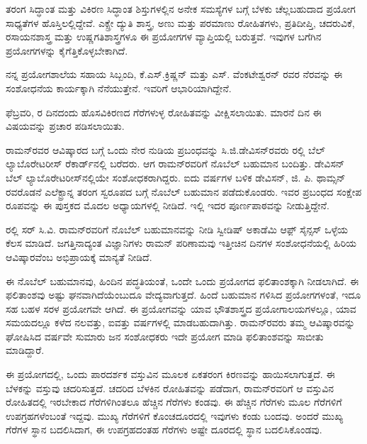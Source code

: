 
ತರಂಗ ಸಿದ್ಧಾಂತ ಮತ್ತು ವಿಕಿರಣ ಸಿದ್ಧಾಂತ ಶಿಸ್ತುಗಳಲ್ಲಿನ ಅನೇಕ ಸಮಸ್ಯೆಗಳ ಬಗ್ಗೆ ಬೆಳಕು ಚೆಲ್ಲಬಹುದಾದ ಪ್ರಯೋಗ ಸಾಧ್ಯತೆಗಳ ಹೊಸ್ತಿಲಲ್ಲಿದ್ದೇವೆ. ಎಕ್ಸ್\enginline{-}ರೇ ದ್ಯುತಿ ಶಾಸ್ತ್ರ, ಅಣು ಮತ್ತು ಪರಮಾಣು ರೋಹಿತಗಳು, ಪ್ರತಿದೀಪ್ತಿ, ಚದರುವಿಕೆ, ರಸಾಯನಶಾಸ್ತ್ರ ಮತ್ತು ಉಷ್ಣಗತಿಶಾಸ್ತ್ರಗಳೂ ಈ ಪ್ರಯೋಗಗಳ ವ್ಯಾಪ್ತಿಯಲ್ಲಿ ಬರುತ್ತವೆ. ಇವುಗಳ ಬಗೆಗಿನ ಪ್ರಯೋಗಗಳನ್ನು ಕೈಗೆತ್ತಿಕೊಳ್ಳಬೇಕಾಗಿದೆ.

ನನ್ನ ಪ್ರಯೋಗಶಾಲೆಯ ಸಹಾಯ ಸಿಬ್ಬಂದಿ, ಕೆ.ಎಸ್.ಕ್ರಿಷ್ಣನ್ ಮತ್ತು ಎಸ್. ವೆಂಕಟೇಶ್ವರನ್ ರವರ ನೆರವನ್ನು ಈ ಸಂಶೋಧನೆಯ ಕಾರ್ಯಕ್ಕಾಗಿ ನೆನೆಯುತ್ತೇನೆ. ಇವರಿಗೆ ಆಭಾರಿಯಾಗಿದ್ದೇನೆ.

 ಫೆಬ್ರವರಿ,  ರ ದಿನದಂದು ಹೊಸವಿಕಿರಣದ ಗೆರೆಗಳುಳ್ಳ ರೋಹಿತವನ್ನು ವೀಕ್ಷಿಸ\-ಲಾಯಿತು. ಮಾರನೆ ದಿನ ಈ ವಿಷಯವನ್ನು ಪ್ರಚಾರ ಪಡಿಸಲಾಯಿತು.



ರಾಮನ್‍ರವರ ಆವಿಷ್ಕಾರದ ಬಗ್ಗೆ ಒಂದು ನೇರ ನುಡಿಯ ಪ್ರಬಂಧವನ್ನು ಸಿ.ಜಿ.ಡೇವಿಸನ್‌ರವರು ರಲ್ಲಿ ಬೆಲ್ ಲ್ಯಾಬೊರೇಟರೀಸ್ ರೆಕಾರ್ಡ್‌ನಲ್ಲಿ ಬರೆದರು. ಆಗ ರಾಮನ್‍ರವರಿಗೆ ನೊಬೆಲ್ ಬಹುಮಾನ ಬಂದಿತ್ತು. ಡೇವಿಸನ್ ಬೆಲ್ ಲ್ಯಾಬೊರೇಟರೀಸ್‌ನಲ್ಲಿಯೇ ಸಂಶೋಧಕರಾಗಿ\break ದ್ದರು. ಐದು ವರ್ಷಗಳ ಬಳಿಕ ಡೇವಿಸನ್, ಜಿ. ಪಿ. ಥಾಮ್ಸನ್ ರವರೊಡನೆ ಎಲೆಕ್ಟ್ರಾನ್ನ ತರಂಗ ಸ್ವರೂಪದ ಬಗ್ಗೆ ನೊಬೆಲ್ ಬಹುಮಾನ ಪಡೆದುಕೊಂಡರು. ಇವರ ಪ್ರಬಂಧದ ಸಂಕ್ಷೇಪ ರೂಪವನ್ನು ಈ ಪುಸ್ತಕದ ಮೊದಲ ಅಧ್ಯಾಯಗಳಲ್ಲಿ ನೀಡಿದೆ. ಇಲ್ಲಿ ಇದರ ಪೂರ್ಣಪಾಠವನ್ನು ನೀಡುತ್ತಿದ್ದೇನೆ.

ರಲ್ಲಿ  ಸರ್ ಸಿ.ವಿ. ರಾಮನ್‍ರವರಿಗೆ ನೊಬೆಲ್ ಬಹುಮಾನವನ್ನು ನೀಡಿ ಸ್ವೀಡಿಷ್ ಅಕಾಡೆಮಿ ಆಫ಼್ ಸೈನ್ಸಸ್ ಒಳ್ಳೆಯ ಕೆಲಸ ಮಾಡಿದೆ. ಜಗತ್ತಿನಾದ್ಯಂತ ವಿಜ್ಞಾನಿಗಳು ರಾಮನ್ ಪರಿಣಾಮವು ಇತ್ತೀಚಿನ ದಿನಗಳ ಸಂಶೋಧನೆಯಲ್ಲಿ ಹಿರಿಯ ಆವಿಷ್ಕಾರವೆಂಬ ಅಭಿಪ್ರಾಯಕ್ಕೆ ಮಾನ್ಯತೆ ನೀಡಿದೆ.

ಈ ನೊಬೆಲ್ ಬಹುಮಾನವು, ಹಿಂದಿನ ಪದ್ಧತಿಯಂತೆ, ಒಂದೇ ಒಂದು ಪ್ರಯೋಗದ ಫಲಿತಾಂಶಕ್ಕಾಗಿ ನೀಡಲಾಗಿದೆ. ಈ ಫಲಿತಾಂಶವು ಅಷ್ಟು ಘನವಾಗಿದೆಯೆಂಬುದೂ ವೇದ್ಯವಾಗುತ್ತದೆ. ಹಿಂದೆ ಬಹುಮಾನ ಗಳಿಸಿದ ಪ್ರಯೋಗಗಳಂತೆ, ಇದೂ ಸಹ ಬಹಳ ಸರಳ ಪ್ರಯೋಗವೇ ಆಗಿದೆ. ಈ ಪ್ರಯೋಗವನ್ನು ಯಾವ ಭೌತಶಾಸ್ತ್ರದ ಪ್ರಯೋಗಾಲಯಗಳಲ್ಲೂ, ಯಾವ ಸಮಯದಲ್ಲೂ ಕಳೆದ ನಲವತ್ತು, ಐವತ್ತು ವರ್ಷಗಳಲ್ಲಿ ಮಾಡಬಹುದಾಗಿತ್ತು. ರಾಮನ್‍ರವರು ತಮ್ಮ ಆವಿಷ್ಕಾರವನ್ನು ಘೋಷಿಸಿದ ವರ್ಷವೇ ಸುಮಾರು  ಜನ ಸಂಶೋಧಕರು ಇದೇ ಪ್ರಯೋಗ ಮಾಡಿ ಫಲಿತಾಂಶವನ್ನು ಸಾಬೀತು ಮಾಡಿದ್ದಾರೆ.

ಈ ಪ್ರಯೋಗದಲ್ಲಿ, ಒಂದು ಪಾರದರ್ಶಕ ವಸ್ತುವಿನ ಮೂಲಕ ಏಕತರಂಗ ಕಿರಣವನ್ನು ಹಾಯಿಸಲಾಗುತ್ತದೆ. ಈ ಬೆಳಕನ್ನು ವಸ್ತುವು ಚದರಿಸುತ್ತದೆ. ಚದರಿದ ಬೆಳಕಿನ ರೋಹಿತವನ್ನು ಪಡೆದಾಗ, ರಾಮನ್‍ರವರಿಗೆ ಆ ವಸ್ತುವಿನ ರೋಹಿತದಲ್ಲಿ ಇರಬೇಕಾದ ಗೆರೆಗಳಿಗಿಂತಲೂ ಹೆಚ್ಚಿನ ಗೆರೆಗಳು ಕಂಡವು. ಈ ಹೆಚ್ಚಿನ ಗೆರೆಗಳು ಮೂಲ ಗೆರೆಗಳಿಗೆ ಉಪಗ್ರಹಗಳೆಂಬಂತೆ ಇದ್ದವು. ಮುಖ್ಯ ಗೆರೆಗಳಿಗೆ ಕೊಂಚದೂರದಲ್ಲಿ ಇವುಗಳು ಕಂಡು ಬಂದವು. ಅಂದರೆ ಮುಖ್ಯ ಗೆರೆಗಳ ಸ್ಥಾನ ಬದಲಿಸಿದಾಗ, ಈ ಉಪಗ್ರಹದಂತಹ ಗೆರೆಗಳು ಅಷ್ಟೇ ದೂರದಲ್ಲಿ ಸ್ಥಾನ ಬದಲಿಸಿಕೊಂಡವು.

